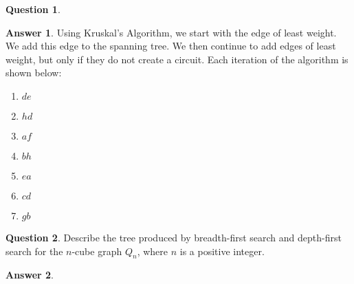 \documentclass[article, 12pt]{article}
\theoremstyle{definition}
\newtheorem{question}{Question}
\newtheorem{answer}{Answer}
\begin{document}
\begin{question}
\begin{figure}[H]
        \end{figure}
    \end{question}

    \begin{answer}
        \label{a6}
        Using Kruskal's Algorithm, we start with the edge of least weight. We add this edge to the spanning tree. We then continue to add edges of least weight, but only if they do not create a circuit. Each iteration of the algorithm is shown below:
        \begin{enumerate}
            \item $de$
            \item $hd$
            \item $af$
            \item $bh$
            \item $ea$
            \item $cd$
            \item $gb$
        \end{enumerate}
    \end{answer}

    \begin{question}
        \label{q7}
        Describe the tree produced by breadth-first search and depth-first search for the $n$-cube graph $Q_n$, where $n$ is a positive integer.
    \end{question}

    \begin{answer}
        \label{a7}
    \end{answer}
\end{document}

